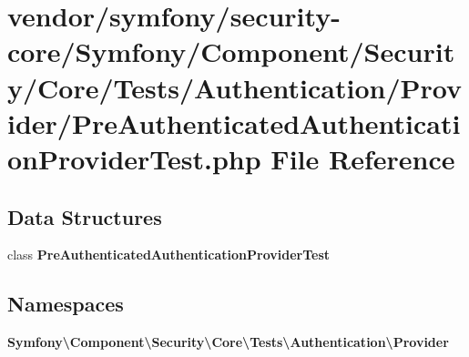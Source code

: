 \section{vendor/symfony/security-\/core/\+Symfony/\+Component/\+Security/\+Core/\+Tests/\+Authentication/\+Provider/\+Pre\+Authenticated\+Authentication\+Provider\+Test.php File Reference}
\label{_pre_authenticated_authentication_provider_test_8php}
\subsection*{Data Structures}
\begin{DoxyCompactItemize}
\item 
class {\bf Pre\+Authenticated\+Authentication\+Provider\+Test}
\end{DoxyCompactItemize}
\subsection*{Namespaces}
\begin{DoxyCompactItemize}
\item 
 {\bf Symfony\textbackslash{}\+Component\textbackslash{}\+Security\textbackslash{}\+Core\textbackslash{}\+Tests\textbackslash{}\+Authentication\textbackslash{}\+Provider}
\end{DoxyCompactItemize}
